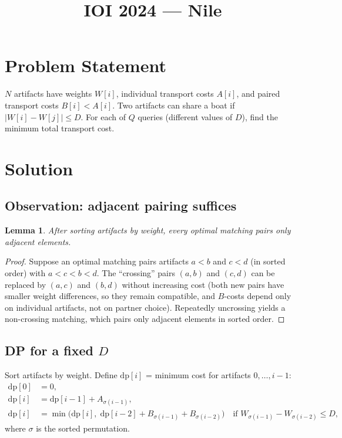 \documentclass[11pt,a4paper]{article}
\title{IOI 2024 --- Nile}
\author{}
\date{}
\newtheorem{lemma}[theorem]{Lemma}
\begin{document}
\maketitle

\section{Problem Statement}

$N$ artifacts have weights $W[i]$, individual transport costs $A[i]$,
and paired transport costs $B[i] < A[i]$.  Two artifacts can share a
boat if $|W[i] - W[j]| \le D$.  For each of $Q$ queries (different
values of $D$), find the minimum total transport cost.

\section{Solution}

\subsection{Observation: adjacent pairing suffices}

\begin{lemma}\label{lem:adjacent}
After sorting artifacts by weight, every optimal matching pairs only
adjacent elements.
\end{lemma}

\begin{proof}
Suppose an optimal matching pairs artifacts $a < b$ and $c < d$ (in
sorted order) with $a < c < b < d$.  The ``crossing'' pairs $(a,b)$ and
$(c,d)$ can be replaced by $(a,c)$ and $(b,d)$ without increasing cost
(both new pairs have smaller weight differences, so they remain
compatible, and $B$-costs depend only on individual artifacts, not on
partner choice).  Repeatedly uncrossing yields a non-crossing matching,
which pairs only adjacent elements in sorted order.
\end{proof}

\subsection{DP for a fixed $D$}

Sort artifacts by weight.  Define $\mathrm{dp}[i]$ = minimum cost for
artifacts $0, \ldots, i{-}1$:
\begin{align*}
  \mathrm{dp}[0] &= 0,\\
  \mathrm{dp}[i] &= \mathrm{dp}[i{-}1] + A_{\sigma(i{-}1)},\\
  \mathrm{dp}[i] &= \min\bigl(\mathrm{dp}[i],\;
    \mathrm{dp}[i{-}2] + B_{\sigma(i{-}1)} + B_{\sigma(i{-}2)}\bigr)
    \quad\text{if } W_{\sigma(i{-}1)} - W_{\sigma(i{-}2)} \le D,
\end{align*}
where $\sigma$ is the sorted permutation.
\end{document}

